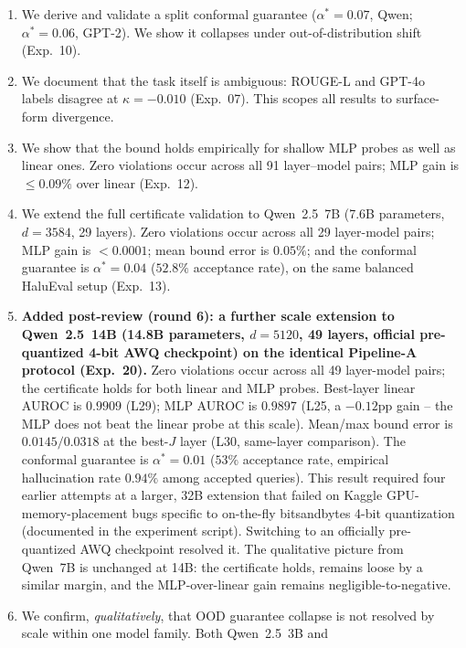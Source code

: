 \documentclass[10pt,twocolumn]{article}
\begin{document}
\begin{enumerate}[leftmargin=*, topsep=2pt, itemsep=1pt]
    GPT-2. This establishes architecture-dependent certificate selection
    (Exp.~08).
  \item We derive and validate a split conformal guarantee
    ($\alpha^* = 0.07$, Qwen; $\alpha^* = 0.06$, GPT-2). We show it
    collapses under out-of-distribution shift (Exp.~10).
  \item We document that the task itself is ambiguous: ROUGE-L and
    GPT-4o labels disagree at $\kappa = -0.010$ (Exp.~07). This scopes
    all results to surface-form divergence.
  \item We show that the bound holds empirically for shallow MLP probes
    as well as linear ones. Zero violations occur across all 91
    layer--model pairs; MLP gain is $\leq 0.09\%$ over linear (Exp.~12).
  \item We extend the full certificate validation to Qwen~2.5~7B (7.6B
    parameters, $d=3584$, 29 layers). Zero violations occur across all
    29 layer-model pairs; MLP gain is $< 0.0001$; mean bound error is
    $0.05\%$; and the conformal guarantee is $\alpha^* = 0.04$ ($52.8\%$
    acceptance rate), on the same balanced HaluEval setup (Exp.~13).
  \item \textbf{Added post-review (round 6): a further scale extension to
    Qwen~2.5~14B (14.8B parameters, $d=5120$, 49 layers, official
    pre-quantized 4-bit AWQ checkpoint) on the identical Pipeline-A
    protocol (Exp.~20).} Zero violations occur across all 49 layer-model
    pairs; the certificate holds for both linear and MLP probes.
    Best-layer linear AUROC is $0.9909$ (L29); MLP AUROC is $0.9897$
    (L25, a $-0.12$pp gain -- the MLP does not beat the linear probe at
    this scale). Mean/max bound error is $0.0145/0.0318$ at the best-$J$
    layer (L30, same-layer comparison). The conformal guarantee is
    $\alpha^*=0.01$ ($53\%$ acceptance rate, empirical hallucination rate
    $0.94\%$ among accepted queries). This result required four earlier
    attempts at a larger, 32B extension that failed on Kaggle
    GPU-memory-placement bugs specific to on-the-fly bitsandbytes 4-bit
    quantization (documented in the experiment script). Switching to an
    officially pre-quantized AWQ checkpoint resolved it. The qualitative
    picture from Qwen~7B is unchanged at 14B: the certificate holds,
    remains loose by a similar margin, and the MLP-over-linear gain
    remains negligible-to-negative.
  \item We confirm, \emph{qualitatively}, that OOD guarantee collapse is
    not resolved by scale within one model family. Both Qwen~2.5~3B and

\end{enumerate}
\end{document}
